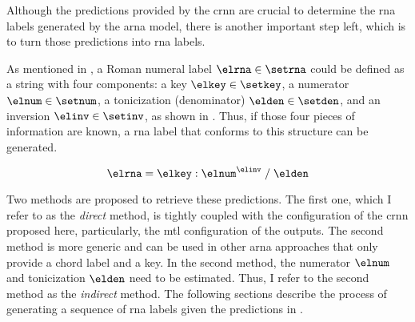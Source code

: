 
Although the predictions provided by the \gls{crnn} are
crucial to determine the \gls{rna} labels generated by the
\gls{arna} model, there is another important step left,
which is to turn those predictions into \gls{rna} labels.

As mentioned in
, a Roman
numeral label $\elrna \in \setrna$ could be defined as a
string with four components: a key $\elkey \in \setkey$, a
numerator $\elnum \in \setnum$, a tonicization (denominator)
$\elden \in \setden$, and an inversion $\elinv \in \setinv$,
as shown in . Thus, if those four pieces of
information are known, a \gls{rna} label that conforms to
this structure can be generated.

\begin{equation}
    \label{eq:rna}
    \elrna = \elkey : \elnum^{\elinv} \; / \; \elden
\end{equation}

Two methods are proposed to retrieve these predictions. The
first one, which I refer to as the \emph{direct} method, is
tightly coupled with the configuration of the \gls{crnn}
proposed here, particularly, the \gls{mtl} configuration of
the outputs. The second method is more generic and can be
used in other \gls{arna} approaches that only provide a
chord label and a key. In the second method, the numerator
$\elnum$ and tonicization $\elden$ need to be estimated.
Thus, I refer to the second method as the \emph{indirect}
method. The following sections describe the process of
generating a sequence of \gls{rna} labels given the
predictions in .




